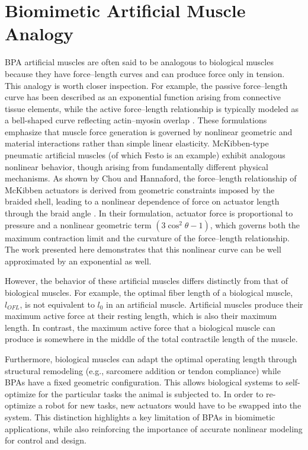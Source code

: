 \section{Biomimetic Artificial Muscle Analogy}\label{sec:disc_bio}

BPA artificial muscles are often said to be analogous to biological muscles because they have force--length curves and can produce force only in tension. This analogy is worth closer inspection. For example, the passive force–length curve has been described as an exponential function arising from connective tissue elements, while the active force–length relationship is typically modeled as a bell-shaped curve reflecting actin–myosin overlap \citep{winters1990}. These formulations emphasize that muscle force generation is governed by nonlinear geometric and material interactions rather than simple linear elasticity.
McKibben-type pneumatic artificial muscles (of which Festo is an example) exhibit analogous nonlinear behavior, though arising from fundamentally different physical mechanisms. As shown by Chou and Hannaford, the force–length relationship of McKibben actuators is derived from geometric constraints imposed by the braided shell, leading to a nonlinear dependence of force on actuator length through the braid angle \cite{chou_measurement_1996}. In their formulation, actuator force is proportional to pressure and a nonlinear geometric term $(3\cos^2\theta - 1)$, which governs both the maximum contraction limit and the curvature of the force–length relationship. The work presented here demonstrates that this nonlinear curve can be well approximated by an exponential as well.

However, the behavior of these artificial muscles differs distinctly from that of biological muscles.
For example, the optimal fiber length of a biological muscle, $l_{OFL}$, is not equivalent to $l_0$ in an artificial muscle. Artificial muscles produce their maximum active force at their resting length, which is also their maximum length. In contrast, the maximum active force that a biological muscle can produce is somewhere in the middle of the total contractile length of the muscle. 

Furthermore, biological muscles can adapt the optimal operating length through structural remodeling (e.g., sarcomere addition or tendon compliance) while BPAs have a fixed geometric configuration. This allows biological systems to self-optimize for the particular tasks the animal is subjected to. In order to re-optimize a robot for new tasks, new actuators would have to be swapped into the system. This distinction highlights a key limitation of BPAs in biomimetic applications, while also reinforcing the importance of accurate nonlinear modeling for control and design.




